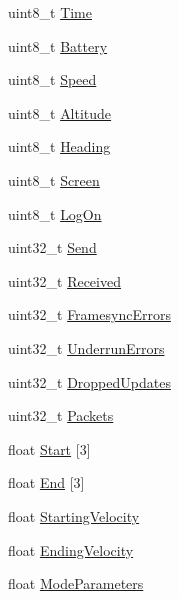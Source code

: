 \begin{DoxyCompactItemize}
\item 
uint8\-\_\-t \hyperlink{struct____attribute_____a6d35c2c8328f1df2fa7e5c95e8a4551c}{\-Time}
\item 
uint8\-\_\-t \hyperlink{struct____attribute_____ada52c8c66ceb855635231dfd60cebfca}{\-Battery}
\item 
uint8\-\_\-t \hyperlink{struct____attribute_____a8990682737da0d16ebf3dc4fad54a38f}{\-Speed}
\item 
uint8\-\_\-t \hyperlink{struct____attribute_____afac38c834695bb4a2f2577b7ba2e0b21}{\-Altitude}
\item 
uint8\-\_\-t \hyperlink{struct____attribute_____ab13fb8103f9d07e91ba64513a490b7d2}{\-Heading}
\item 
uint8\-\_\-t \hyperlink{struct____attribute_____a1d2c9fe6d7cc715b0f794413accd17d3}{\-Screen}
\item 
uint8\-\_\-t \hyperlink{struct____attribute_____aecd8cdce63308b584ce692e0fb67a233}{\-Log\-On}
\item 
uint32\-\_\-t \hyperlink{struct____attribute_____a89f1653eb99d64b4699ada7f5ed283fa}{\-Send}
\item 
uint32\-\_\-t \hyperlink{struct____attribute_____a55edc408b12148f75db0744e731ce1e4}{\-Received}
\item 
uint32\-\_\-t \hyperlink{struct____attribute_____ab9d44907fdbaf9aa9441ed7e8706078b}{\-Framesync\-Errors}
\item 
uint32\-\_\-t \hyperlink{struct____attribute_____abed33ceef035bc071899ec27a54a8046}{\-Underrun\-Errors}
\item 
uint32\-\_\-t \hyperlink{struct____attribute_____af09a2db72ac61b1f5a412e4aab4911b4}{\-Dropped\-Updates}
\item 
uint32\-\_\-t \hyperlink{struct____attribute_____ae8acd5254a465454e91f4f9eb57562ad}{\-Packets}
\item 
float \hyperlink{struct____attribute_____a1714b7ec85a536e359f5a0d5190aa134}{\-Start} \mbox{[}3\mbox{]}
\item 
float \hyperlink{struct____attribute_____a3939b85f1071eb03c02715f5f63c12a4}{\-End} \mbox{[}3\mbox{]}
\item 
float \hyperlink{struct____attribute_____a8bf4ab88e4ab32977ad3a44c4ccdb0e3}{\-Starting\-Velocity}
\item 
float \hyperlink{struct____attribute_____a7f9689f3df16f156dc33db648f8469f0}{\-Ending\-Velocity}
\item 
float \hyperlink{struct____attribute_____a3af6821fa653a4a0daf65622b96f7109}{\-Mode\-Parameters}
\item 

\end{DoxyCompactItemize}
